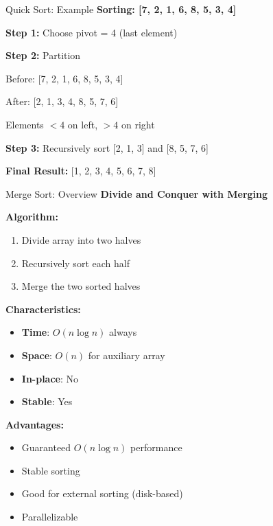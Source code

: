\documentclass[aspectratio=169]{beamer}
\begin{document}
\begin{frame}{Quick Sort: Example}
  \textbf{Sorting: [7, 2, 1, 6, 8, 5, 3, 4]}

  \vspace{0.3cm}
  \textbf{Step 1:} Choose pivot = 4 (last element)

  \textbf{Step 2:} Partition
  \begin{center}
  Before: [7, 2, 1, 6, 8, 5, 3, 4]

  After: [2, 1, 3, 4, 8, 5, 7, 6]

  \vspace{0.2cm}
  Elements $< 4$ on left, $> 4$ on right
  \end{center}

  \vspace{0.3cm}
  \textbf{Step 3:} Recursively sort [2, 1, 3] and [8, 5, 7, 6]

  \vspace{0.2cm}
  \textbf{Final Result:} [1, 2, 3, 4, 5, 6, 7, 8]
\end{frame}

\begin{frame}{Merge Sort: Overview}
  \textbf{Divide and Conquer with Merging}

  \vspace{0.3cm}
  \textbf{Algorithm:}
  \begin{enumerate}
    \item Divide array into two halves
    \item Recursively sort each half
    \item Merge the two sorted halves
  \end{enumerate}

  \vspace{0.3cm}
  \textbf{Characteristics:}
  \begin{itemize}
    \item \textbf{Time}: $O(n \log n)$ always
    \item \textbf{Space}: $O(n)$ for auxiliary array
    \item \textbf{In-place}: No
    \item \textbf{Stable}: Yes
  \end{itemize}

  \vspace{0.3cm}
  \textbf{Advantages:}
  \begin{itemize}
    \item Guaranteed $O(n \log n)$ performance
    \item Stable sorting
    \item Good for external sorting (disk-based)
    \item Parallelizable
  \end{itemize}
\end{frame}
\end{document}
